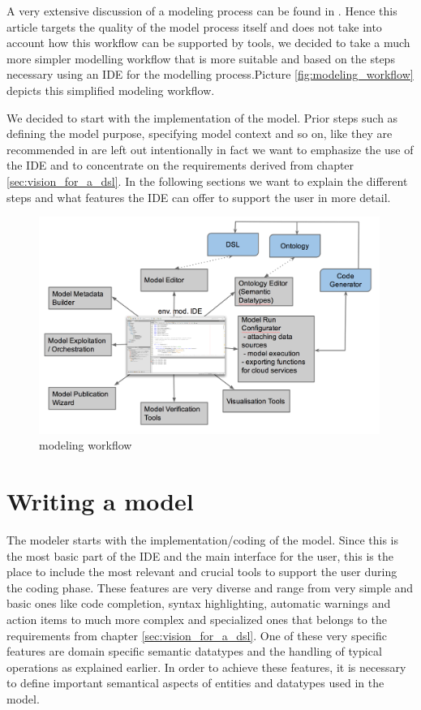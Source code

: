 A very extensive discussion of a modeling process can be found in \autocite{Jakeman2006602}. Hence this article targets the quality of the model process itself and does not take into account how this workflow can be supported by tools, we decided to take a much more simpler modelling workflow that is more suitable and based on the steps necessary using an IDE for the modelling process.Picture \ref{fig:modeling_workflow} depicts this simplified modeling workflow.


We decided to start with the implementation of the model. Prior steps such as defining the model purpose, specifying model context and so on, like they are recommended in \autocite{Jakeman2006602} are left out intentionally in fact we want to emphasize the use of the IDE and to concentrate on the requirements derived from chapter \ref{sec:vision_for_a_dsl}. In the following sections we want to explain the different steps and what features the IDE can offer to support the user in more detail. 

\begin{figure}[h]
	\centering
	\includegraphics[width=0.99\textwidth]{pics/toolchain/toolchain.png}
	\caption{modeling workflow \label{fig:toolchain}}	
\end{figure}


\section{Writing a model} \label{sec:writing_a_model}
The modeler starts with the implementation/coding of the model. Since this is the most basic part of the IDE and the main interface for the user, this is the place to include the most relevant and crucial tools to support the user during the coding phase. These features are very diverse and range from very simple and basic ones like code completion, syntax highlighting, automatic warnings and action items to much more complex and specialized ones that belongs to the requirements from chapter \ref{sec:vision_for_a_dsl}. One of these very specific features are domain specific semantic datatypes and the handling of typical operations as explained earlier. In order to achieve these features, it is necessary to define important semantical aspects of entities and datatypes used in the model.


